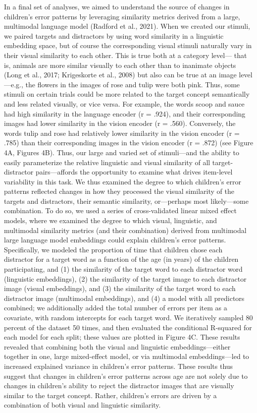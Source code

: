 \documentclass[
  man,mask]{apa6}
\begin{document}
In a final set of analyses, we aimed to understand the source of changes in children's error patterns by leveraging similarity metrics derived from a large, multimodal language model (Radford et al., 2021). When we created our stimuli, we paired targets and distractors by using word similarity in a linguistic embedding space, but of course the corresponding visual stimuli naturally vary in their visual similarity to each other. This is true both at a category level--- that is, animals are more similar visually to each other than to inanimate objects (Long et al., 2017; Krigeskorte et al., 2008) but also can be true at an image level---e.g., the flowers in the images of rose and tulip were both pink. Thus, some stimuli on certain trials could be more related to the target concept semantically and less related visually, or vice versa. For example, the words scoop and sauce had high similarity in the language encoder (r = .924), and their corresponding images had lower similarity in the vision encoder (r = .560). Conversely, the words tulip and rose had relatively lower similarity in the vision encoder (r = .785) than their corresponding images in the vision encoder (r = .872) (see Figure 4A, Figures 4B). Thus, our large and varied set of stimuli---and the ability to easily parameterize the relative linguistic and visual similarity of all target-distractor pairs---affords the opportunity to examine what drives item-level variability in this task. We thus examined the degree to which children's error patterns reflected changes in how they processed the visual similarity of the targets and distractors, their semantic similarity, or---perhaps most likely---some combination.
To do so, we used a series of cross-validated linear mixed effect models, where we examined the degree to which visual, linguistic, and multimodal similarity metrics (and their combination) derived from multimodal large language model embeddings could explain children's error patterns. Specifically, we modeled the proportion of time that children chose each distractor for a target word as a function of the age (in years) of the children participating, and (1) the similarity of the target word to each distractor word (linguistic embeddings), (2) the similarity of the target image to each distractor image (visual embeddings), and (3) the similarity of the target word to each distractor image (multimodal embeddings), and (4) a model with all predictors combined; we additionally added the total number of errors per item as a covariate, with random intercepts for each target word. We iteratively sampled 80 percent of the dataset 50 times, and then evaluated the conditional R-squared for each model for each split; these values are plotted in Figure 4C. These results revealed that combining both the visual and linguistic embeddings---either together in one, large mixed-effect model, or via multimodal embeddings---led to increased explained variance in children's error patterns. These results thus suggest that changes in children's error patterns across age are not solely due to changes in children's ability to reject the distractor images that are visually similar to the target concept. Rather, children's errors are driven by a combination of both visual and linguistic similarity.
\end{document}
